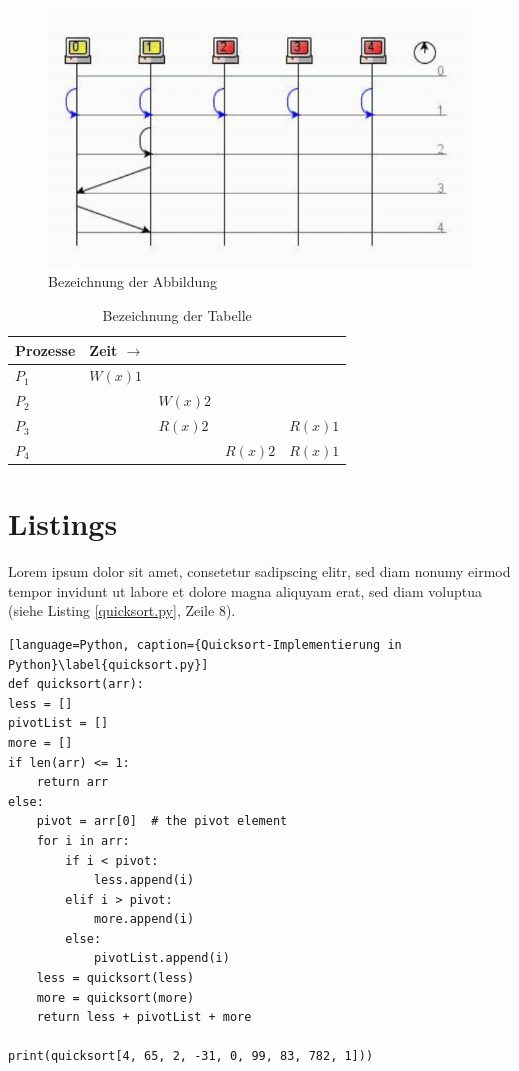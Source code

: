 \begin{figure} %
	\centering
	\includegraphics{images/sequence.pdf}
	\caption{Bezeichnung der Abbildung}
	\label{a1}
\end{figure}

\begin{table} %
	\centering
	\begin{tabular}{l | l l l l}
		\textbf{Prozesse} & \textbf{Zeit} $\rightarrow$ \\
		\hline
		$P_{1}$ & $W(x)1$ \\
		$P_{2}$ & & $W(x)2$ \\
		$P_{3}$ & & $R(x)2$ & & $R(x)1$\\
		$P_{4}$ & & & $R(x)2$ & $R(x)1$\\
	\end{tabular}
	\caption{Bezeichnung der Tabelle}
	\label{t1}
\end{table}

\section{Listings}

Lorem ipsum dolor sit amet, consetetur sadipscing elitr, sed diam nonumy eirmod tempor invidunt ut labore et dolore magna aliquyam erat, sed diam voluptua (siehe Listing \ref{quicksort.py}, Zeile 8).

\begin{lstlisting}[language=Python, caption={Quicksort-Implementierung in Python}\label{quicksort.py}]
def quicksort(arr):
less = []
pivotList = []
more = []
if len(arr) <= 1:
	return arr
else:
	pivot = arr[0]	# the pivot element
	for i in arr:
		if i < pivot:
			less.append(i)
		elif i > pivot:
			more.append(i)
		else:
			pivotList.append(i)
	less = quicksort(less)
	more = quicksort(more)
	return less + pivotList + more

print(quicksort[4, 65, 2, -31, 0, 99, 83, 782, 1]))
\end{lstlisting}

